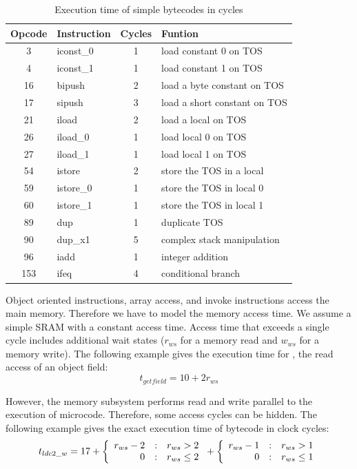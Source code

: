 \begin{table}
\centering
\begin{tabular*}{\columnwidth}{@{\extracolsep{\fill}} clcl}
    \toprule
    Opcode & Instruction & Cycles & Funtion\\
    \midrule
3 & iconst\_0  & 1 & load constant 0 on TOS\\
4 & iconst\_1  & 1 & load constant 1 on TOS\\
16 & bipush & 2 & load a byte constant on TOS\\
17 & sipush & 3 & load a short constant on TOS\\
21 & iload  & 2 & load a local on TOS\\
26 & iload\_0 & 1 & load local 0 on TOS\\
27 & iload\_1 & 1 & load local 1 on TOS\\
54 & istore  & 2 & store the TOS in a local\\
59 & istore\_0 & 1 & store the TOS in local 0\\
60 & istore\_1 & 1 & store the TOS in local 1\\
89 & dup & 1 & duplicate TOS\\
90 & dup\_x1 & 5 & complex stack manipulation\\
96 & iadd & 1 & integer addition\\
153 & ifeq & 4 & conditional branch\\
    \bottomrule
\end{tabular*}
    \caption{Execution time of simple bytecodes in cycles}
    \label{tab:simple}
\end{table}



Object oriented instructions, array access, and invoke instructions
access the main memory. Therefore we have to model the memory access
time. We assume a simple SRAM with a constant access time. Access
time that exceeds a single cycle includes additional wait states
($r_{ws}$ for a memory read and $w_{ws}$ for a memory write). The
following example gives the execution time for , the
read access of an object field:
%
{\small
\begin{equation*}
    t_{getfield} = 10+2 r_{ws}
\end{equation*}
}


However, the memory subsystem performs read and write parallel to
the execution of microcode. Therefore, some access cycles can be
hidden. The following example gives the exact execution time of
bytecode  in clock cycles:
%
{\small
\begin{equation*}
    t_{ldc2\_w} = 17+\left\{\begin{array}{r@{\quad:\quad}l}
    r_{ws}-2 & r_{ws}>2 \\
    0   & r_{ws}\le2
    \end{array} \right.
    +
    \left\{\begin{array}{r@{\quad:\quad}l}
    r_{ws}-1 & r_{ws}>1 \\
    0   & r_{ws}\le1
    \end{array} \right.
\end{equation*}}

